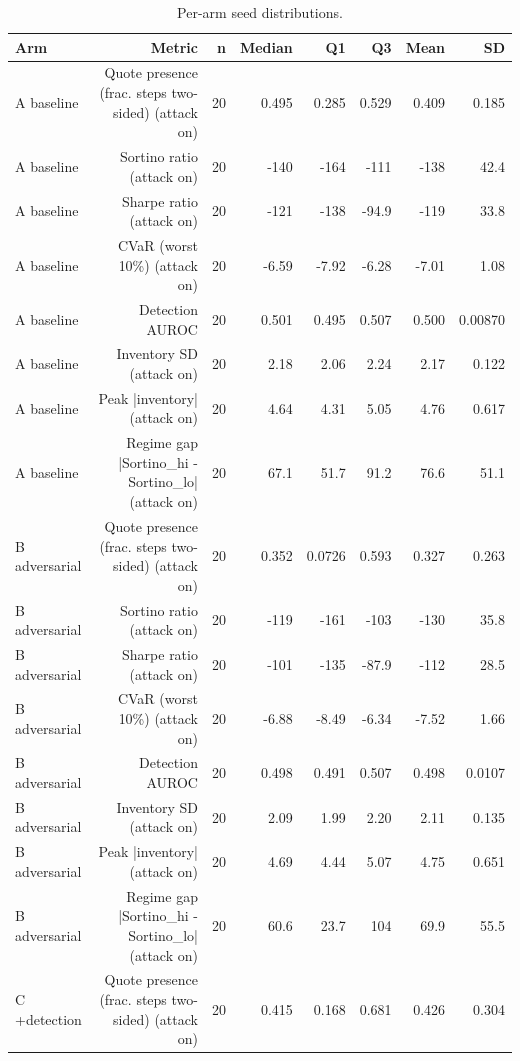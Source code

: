 \begin{table}[htbp]
  \centering
  \caption{Per-arm seed distributions.}
  \label{tab:summary}
  \begin{tabular}{lrrrrrrr}
    \toprule
    Arm & Metric & n & Median & Q1 & Q3 & Mean & SD \\
    \midrule
    A  baseline & Quote presence (frac. steps two-sided) (attack on) & 20 & 0.495 & 0.285 & 0.529 & 0.409 & 0.185 \\
    A  baseline & Sortino ratio (attack on) & 20 & -140 & -164 & -111 & -138 & 42.4 \\
    A  baseline & Sharpe ratio (attack on) & 20 & -121 & -138 & -94.9 & -119 & 33.8 \\
    A  baseline & CVaR (worst 10\%) (attack on) & 20 & -6.59 & -7.92 & -6.28 & -7.01 & 1.08 \\
    A  baseline & Detection AUROC & 20 & 0.501 & 0.495 & 0.507 & 0.500 & 0.00870 \\
    A  baseline & Inventory SD (attack on) & 20 & 2.18 & 2.06 & 2.24 & 2.17 & 0.122 \\
    A  baseline & Peak |inventory| (attack on) & 20 & 4.64 & 4.31 & 5.05 & 4.76 & 0.617 \\
    A  baseline & Regime gap  |Sortino\_hi - Sortino\_lo| (attack on) & 20 & 67.1 & 51.7 & 91.2 & 76.6 & 51.1 \\
    B  adversarial & Quote presence (frac. steps two-sided) (attack on) & 20 & 0.352 & 0.0726 & 0.593 & 0.327 & 0.263 \\
    B  adversarial & Sortino ratio (attack on) & 20 & -119 & -161 & -103 & -130 & 35.8 \\
    B  adversarial & Sharpe ratio (attack on) & 20 & -101 & -135 & -87.9 & -112 & 28.5 \\
    B  adversarial & CVaR (worst 10\%) (attack on) & 20 & -6.88 & -8.49 & -6.34 & -7.52 & 1.66 \\
    B  adversarial & Detection AUROC & 20 & 0.498 & 0.491 & 0.507 & 0.498 & 0.0107 \\
    B  adversarial & Inventory SD (attack on) & 20 & 2.09 & 1.99 & 2.20 & 2.11 & 0.135 \\
    B  adversarial & Peak |inventory| (attack on) & 20 & 4.69 & 4.44 & 5.07 & 4.75 & 0.651 \\
    B  adversarial & Regime gap  |Sortino\_hi - Sortino\_lo| (attack on) & 20 & 60.6 & 23.7 & 104 & 69.9 & 55.5 \\
    C  +detection & Quote presence (frac. steps two-sided) (attack on) & 20 & 0.415 & 0.168 & 0.681 & 0.426 & 0.304 \\

\end{tabular}
\end{table}
